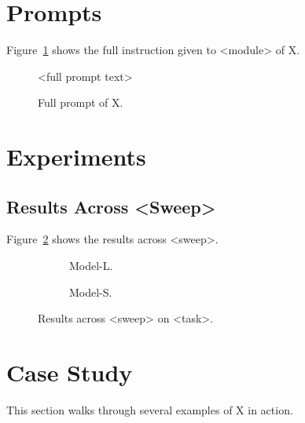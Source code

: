 \clearpage
\section{Prompts} \label{apdx:prompts}
Figure~\ref{fig:full-prompt} shows the full instruction given to <module> of X.
\begin{figure}[ht]
    \centering
    \begin{gptpromptbox}
    \raggedright\small\ttfamily
    <full prompt text>
    \end{gptpromptbox}
    \caption{Full prompt of X.}
    \label{fig:full-prompt}
\end{figure}

\clearpage
\section{Experiments} \label{apdx:experiments}
\subsection{Results Across <Sweep>} \label{apdx:sweep}
Figure~\ref{fig:apdx-sweep} shows the results across <sweep>.
\begin{figure}[!ht]
    \centering
    \begin{subfigure}[t]{0.49\columnwidth}
        \centering
        \caption{Model-L.}
    \end{subfigure}
    \begin{subfigure}[t]{0.49\columnwidth}
        \centering
        \caption{Model-S.}
    \end{subfigure}
    \caption{Results across <sweep> on <task>.}
    \label{fig:apdx-sweep}
\end{figure}

\clearpage
\section{Case Study} \label{apdx:case-study}
This section walks through several examples of X in action.
